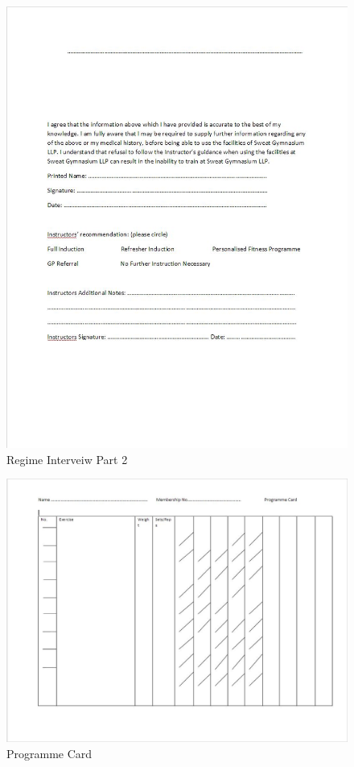 \begin{figure}[H]
    \includegraphics[width=\textwidth]{Regime Interveiw 2.JPG}
    \caption{Regime Interveiw Part 2} \label{fig:Regime Interveiw Part 2}
\end{figure}

\begin{figure}[H]
    \includegraphics[width=\textwidth]{Programme card.JPG}
    \caption{Programme Card} \label{fig:Programme Card}
\end{figure}

